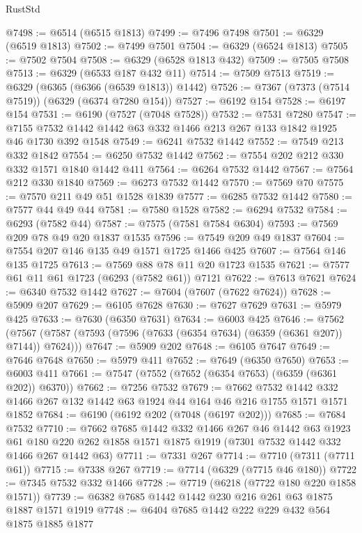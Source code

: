 \begin{lexlean}{RustStd}
\begin{coremodule}
{\begin{coremodule}
{{{{{{{{{{{{{{{{{{{{{{{{{{{{{{{{{{{@7498 := @6514 (@6515 @1813)
@7499 := @7496 @7498
@7501 := @6329 (@6519 @1813)
@7502 := @7499 @7501
@7504 := @6329 (@6524 @1813)
@7505 := @7502 @7504
@7508 := @6329 (@6528 @1813 @432)
@7509 := @7505 @7508
@7513 := @6329 (@6533 @187 @432 @11)
@7514 := @7509 @7513
@7519 := @6329 (@6365 (@6366 (@6539 @1813)) @1442)
@7526 := @7367 (@7373 (@7514 @7519)) (@6329 (@6374 @7280 @154))
@7527 := @6192 @154
@7528 := @6197 @154
@7531 := @6190 (@7527 (@7048 @7528))
@7532 := @7531 @7280
@7547 := @7155 @7532 @1442 @1442 @63 @332 @1466 @213 @267 @133 @1842 @1925 @46 @1730 @392 @1548
@7549 := @6241 @7532 @1442
@7552 := @7549 @213 @332 @1842
@7554 := @6250 @7532 @1442
@7562 := @7554 @202 @212 @330 @332 @1571 @1840 @1442 @411
@7564 := @6264 @7532 @1442
@7567 := @7564 @212 @330 @1840
@7569 := @6273 @7532 @1442
@7570 := @7569 @70
@7575 := @7570 @211 @49 @51 @1528 @1839
@7577 := @6285 @7532 @1442
@7580 := @7577 @44 @49 @44
@7581 := @7580 @1528
@7582 := @6294 @7532
@7584 := @6293 (@7582 @44)
@7587 := @7575 (@7581 @7584 @6304)
@7593 := @7569 @209 @78 @49 @20 @1837 @1535
@7596 := @7549 @209 @49 @1837
@7604 := @7554 @207 @146 @135 @49 @1571 @1725 @1466 @425
@7607 := @7564 @146 @135 @1725
@7613 := @7569 @88 @78 @11 @20 @1723 @1535
@7621 := @7577 @61 @11 @61 @1723 (@6293 (@7582 @61)) @7121
@7622 := @7613 @7621
@7624 := @6340 @7532 @1442
@7627 := @7604 (@7607 (@7622 @7624))
@7628 := @5909 @207
@7629 := @6105 @7628
@7630 := @7627 @7629
@7631 := @5979 @425
@7633 := @7630 (@6350 @7631)
@7634 := @6003 @425
@7646 := @7562
    (@7567 (@7587 (@7593 (@7596 (@7633 (@6354 @7634) (@6359 (@6361 @207)) @7144)) @7624)))
@7647 := @5909 @202
@7648 := @6105 @7647
@7649 := @7646 @7648
@7650 := @5979 @411
@7652 := @7649 (@6350 @7650)
@7653 := @6003 @411
@7661 := @7547 (@7552 (@7652 (@6354 @7653) (@6359 (@6361 @202)) @6370))
@7662 := @7256 @7532
@7679 := @7662
    @7532
    @1442
    @332
    @1466
    @267
    @132
    @1442
    @63
    @1924
    @44
    @164
    @46
    @216
    @1755
    @1571
    @1571
    @1852
@7684 := @6190 (@6192 @202 (@7048 (@6197 @202)))
@7685 := @7684 @7532
@7710 := @7662
    @7685
    @1442
    @332
    @1466
    @267
    @46
    @1442
    @63
    @1923
    @61
    @180
    @220
    @262
    @1858
    @1571
    @1875
    @1919
    (@7301 @7532 @1442 @332 @1466 @267 @1442 @63)
@7711 := @7331 @267
@7714 := @7710 (@7311 (@7711 @61))
@7715 := @7338 @267
@7719 := @7714 (@6329 (@7715 @46 @180))
@7722 := @7345 @7532 @332 @1466
@7728 := @7719 (@6218 (@7722 @180 @220 @1858 @1571))
@7739 := @6382 @7685 @1442 @1442 @230 @216 @261 @63 @1875 @1887 @1571 @1919
@7748 := @6404 @7685 @1442 @222 @229 @432 @564 @1875 @1885 @1877
}}}}}}}}}}}}}}}}}}}}}}}}}}}}}}}}}}}
\end{coremodule}}
\end{coremodule}
\end{lexlean}

